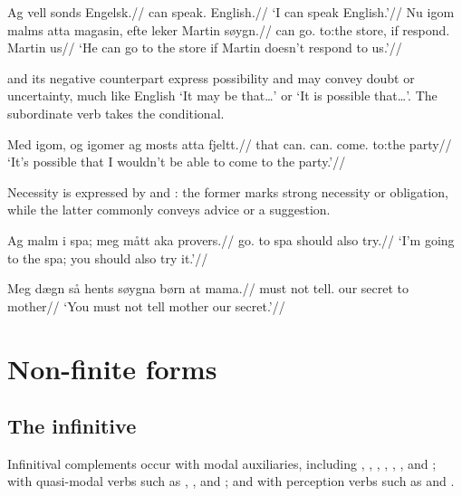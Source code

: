 \pex
\begingl
\gla Ag vell sonds Engelsk.//
\glb \First{}\Sg{} can speak.\Inf{} English.//
\glft `I can speak English.'//
\endgl
\xe
\pex
\begingl
\gla Nu igom malms atta magasin, efte leker Martin søygn.//
\glb \Third{}\Sg{} can go.\Inf{} to:the store, if respond.\N{}\Cond{} Martin us//
\glft `He can go to the store if Martin doesn't respond to us.'//
\endgl
\xe

 and its negative counterpart  express possibility and may convey doubt or uncertainty, much like English `It may be that\dots' or `It is possible that\dots'. The subordinate verb takes the conditional.

\pex
\begingl
\gla Med igom, og igomer ag mosts atta fjeltt.//
\glb that can.\Pres{} \Cmpl{} can.\N{}\Cond{} \First{}\Sg{} come.\Inf{} to:the party//
\glft `It's possible that I wouldn't be able to come to the party.'//
\endgl
\xe

Necessity is expressed by  and : the former marks strong necessity or obligation, while the latter commonly conveys advice or a suggestion.

\pex
\begingl
\gla Ag malm i spa; meg mått aka provers.//
\glb \First{}\Sg{} go.\Pres{} to spa \Second{}\Sg{} should also try.\Inf{}//
\glft `I'm going to the spa; you should also try it.'//
\endgl
\xe

\pex
\begingl
\gla Meg dægn så hents søygna børn at mama.//
\glb \Second{}\Sg{} must not tell.\Inf{} our secret to mother//
\glft `You must not tell mother our secret.'//
\endgl
\xe

\section{Non-finite forms}

\subsection{The infinitive}
\label{sec:infinitive}


Infinitival complements occur with modal auxiliaries, including , , , , , , and ; with quasi-modal verbs such as , , and ; and with perception verbs such as  and .

